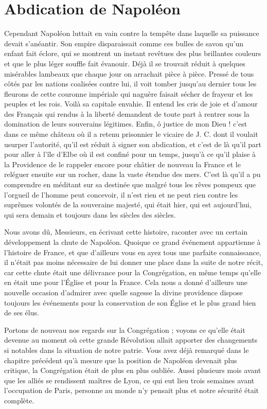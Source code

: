 \section*{Abdication de Napoléon}
Cependant Napoléon luttait en vain contre la tempête dans laquelle sa puissance devait s'anéantir. Son empire disparaissait comme ces bulles de savon qu'un enfant fait éclore, qui se montrent un instant revêtues des plus brillantes couleurs et que le plus léger souffle fait évanouir. Déjà il se trouvait réduit à quelques misérables lambeaux que chaque jour on arrachait pièce à pièce. Pressé de tous côtés par les nations coalisées contre lui, il voit tomber jusqu'au dernier tous les fleurons de cette couronne impériale qui naguère faisait sécher de frayeur et les peuples et les rois. Voilà sa capitale envahie. Il entend les cris de joie et d'amour des Français qui rendus à la liberté demandent de toute part à rentrer sous la domination de leurs souverains légitimes. Enfin, ô justice de mon Dieu ! c'est dans ce même château où il a retenu prisonnier le vicaire de J. C. dont il voulait usurper l'autorité, qu'il est réduit à signer son abdication, et c'est de là qu'il part pour aller à l'île d'Elbe où il est confiné pour un temps, jusqu'à ce qu'il plaise à la Providence de le rappeler encore pour châtier de nouveau la France et le reléguer ensuite sur un rocher, dans la vaste étendue des mers. C'est là qu'il a pu comprendre en méditant sur sa destinée que malgré tous les rêves pompeux
que l'orgueil de l'homme peut concevoir, il n'est rien et ne peut rien contre les suprêmes volontés de la souveraine majesté, qui était hier, qui est aujourd'hui, qui sera demain et toujours dans les siècles des siècles.

Nous avons dû, Messieurs, en écrivant cette histoire, raconter avec un certain développement la chute de Napoléon. Quoique ce grand événement appartienne à l'histoire de France, et que d'ailleurs vous en ayez tous une parfaite connaissance, il n'était pas moins nécessaire de lui donner une place dans la suite de notre récit, car cette chute était une délivrance pour la Congrégation, en même temps qu'elle en était une pour l'Église et pour la France. Cela nous a donné d'ailleurs une nouvelle occasion d'admirer avec quelle sagesse la divine providence dispose toujours les événements pour la conservation de son Église et le plus grand bien de ses élus.

Portons de nouveau nos regards sur la Congrégation ; voyons ce qu'elle était devenue au moment où cette grande Révolution allait apporter des changements si notables dans la situation de notre patrie. Vous avez déjà remarqué dans le chapitre précédent qu'à mesure que la position de Napoléon devenait plus critique, la Congrégation était de plus en plus oubliée. Aussi plusieurs mois avant que les alliés se rendissent maîtres de Lyon, ce qui eut lieu trois semaines avant l'occupation de Paris, personne au monde n'y pensait plus et notre sécurité était complète.

